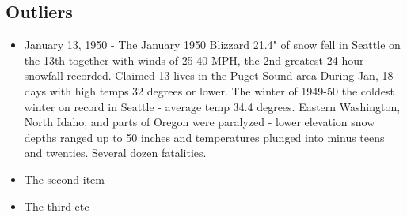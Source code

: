 \subsection{Outliers}

\begin{itemize}
  \item January 13, 1950 - The January 1950 Blizzard
  21.4" of snow fell in Seattle on the 13th together with winds of 25-40 MPH, the 
  2nd greatest 24 hour snowfall recorded. Claimed 13 lives in the Puget Sound area
  During Jan, 18 days with high temps 32 degrees or lower.
  The winter of 1949-50 the coldest winter on record in Seattle - average temp 
  34.4 degrees. Eastern Washington, North Idaho, and parts of Oregon were 
  paralyzed - lower elevation snow depths ranged up to 50 inches and temperatures
  plunged into minus teens and twenties. Several dozen fatalities.
  \item The second item
  \item The third etc
\end{itemize}
